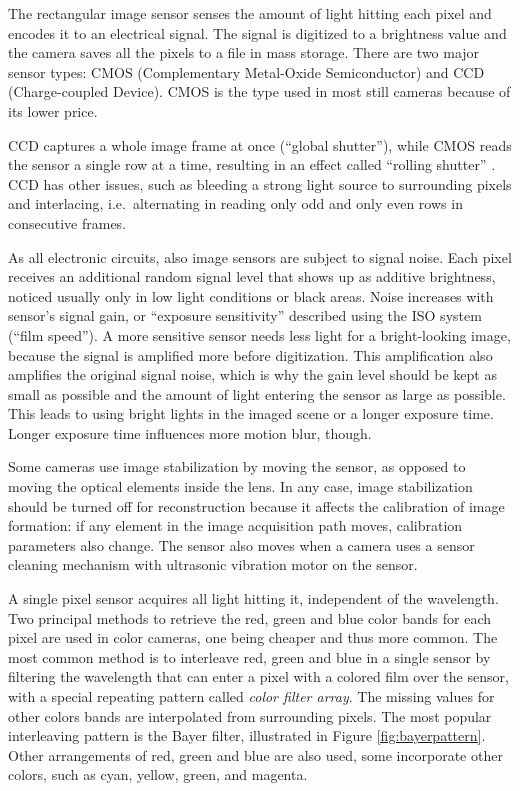 
The rectangular image sensor senses the amount of light hitting each pixel and encodes it to an electrical signal.
The signal is digitized to a brightness value and the camera saves all the pixels to a file in mass storage.
There are two major sensor types: CMOS (Complementary Metal-Oxide Semiconductor) and CCD (Charge-coupled Device).
CMOS is the type used in most still cameras because of its lower price.

CCD captures a whole image frame at once (``global shutter''), while CMOS reads the sensor a single row at a time, resulting in an effect called ``rolling shutter'' \cite{todo:cmos}.
CCD has other issues, such as bleeding a strong light source to surrounding pixels and interlacing, i.e.~alternating in reading only odd and only even rows in consecutive frames.


As all electronic circuits, also image sensors are subject to signal noise.
Each pixel receives an additional random signal level that shows up as additive brightness, noticed usually only in low light conditions or black areas.
Noise increases with sensor's signal gain, or ``exposure sensitivity'' described using the ISO system (``film speed'').
A more sensitive sensor needs less light for a bright-looking image, because the signal is amplified more before digitization.
This amplification also amplifies the original signal noise, which is why the gain level should be kept as small as possible and the amount of light entering the sensor as large as possible.
This leads to using bright lights in the imaged scene or a longer exposure time.
Longer exposure time influences more motion blur, though.


Some cameras use image stabilization by moving the sensor, as opposed to moving the optical elements inside the lens.
In any case, image stabilization should be turned off for reconstruction because it affects the calibration of image formation: if any element in the image acquisition path moves, calibration parameters also change.
The sensor also moves when a camera uses a sensor cleaning mechanism with ultrasonic vibration motor on the sensor.


A single pixel sensor acquires all light hitting it, independent of the wavelength.
Two principal methods to retrieve the red, green and blue color bands for each pixel are used in color cameras, one being cheaper and thus more common.
The most common method is to interleave red, green and blue in a single sensor by filtering the wavelength that can enter a pixel with a colored film over the sensor, with a special repeating pattern called \emph{color filter array}.
The missing values for other colors bands are interpolated from surrounding pixels.
The most popular interleaving pattern is the Bayer filter, illustrated in Figure \ref{fig:bayerpattern}.
Other arrangements of red, green and blue are also used, some incorporate other colors, such as cyan, yellow, green, and magenta.

